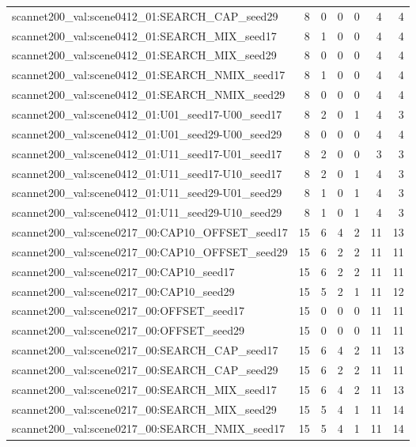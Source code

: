 \begin{table}[t]
\begin{tabular}{lrrrrrr}
scannet200\_val:scene0412\_01:SEARCH\_CAP\_seed29 & 8 & 0 & 0 & 0 & 4 & 4 \\
scannet200\_val:scene0412\_01:SEARCH\_MIX\_seed17 & 8 & 1 & 0 & 0 & 4 & 4 \\
scannet200\_val:scene0412\_01:SEARCH\_MIX\_seed29 & 8 & 0 & 0 & 0 & 4 & 4 \\
scannet200\_val:scene0412\_01:SEARCH\_NMIX\_seed17 & 8 & 1 & 0 & 0 & 4 & 4 \\
scannet200\_val:scene0412\_01:SEARCH\_NMIX\_seed29 & 8 & 0 & 0 & 0 & 4 & 4 \\
scannet200\_val:scene0412\_01:U01\_seed17-U00\_seed17 & 8 & 2 & 0 & 1 & 4 & 3 \\
scannet200\_val:scene0412\_01:U01\_seed29-U00\_seed29 & 8 & 0 & 0 & 0 & 4 & 4 \\
scannet200\_val:scene0412\_01:U11\_seed17-U01\_seed17 & 8 & 2 & 0 & 0 & 3 & 3 \\
scannet200\_val:scene0412\_01:U11\_seed17-U10\_seed17 & 8 & 2 & 0 & 1 & 4 & 3 \\
scannet200\_val:scene0412\_01:U11\_seed29-U01\_seed29 & 8 & 1 & 0 & 1 & 4 & 3 \\
scannet200\_val:scene0412\_01:U11\_seed29-U10\_seed29 & 8 & 1 & 0 & 1 & 4 & 3 \\
scannet200\_val:scene0217\_00:CAP10\_OFFSET\_seed17 & 15 & 6 & 4 & 2 & 11 & 13 \\
scannet200\_val:scene0217\_00:CAP10\_OFFSET\_seed29 & 15 & 6 & 2 & 2 & 11 & 11 \\
scannet200\_val:scene0217\_00:CAP10\_seed17 & 15 & 6 & 2 & 2 & 11 & 11 \\
scannet200\_val:scene0217\_00:CAP10\_seed29 & 15 & 5 & 2 & 1 & 11 & 12 \\
scannet200\_val:scene0217\_00:OFFSET\_seed17 & 15 & 0 & 0 & 0 & 11 & 11 \\
scannet200\_val:scene0217\_00:OFFSET\_seed29 & 15 & 0 & 0 & 0 & 11 & 11 \\
scannet200\_val:scene0217\_00:SEARCH\_CAP\_seed17 & 15 & 6 & 4 & 2 & 11 & 13 \\
scannet200\_val:scene0217\_00:SEARCH\_CAP\_seed29 & 15 & 6 & 2 & 2 & 11 & 11 \\
scannet200\_val:scene0217\_00:SEARCH\_MIX\_seed17 & 15 & 6 & 4 & 2 & 11 & 13 \\
scannet200\_val:scene0217\_00:SEARCH\_MIX\_seed29 & 15 & 5 & 4 & 1 & 11 & 14 \\
scannet200\_val:scene0217\_00:SEARCH\_NMIX\_seed17 & 15 & 5 & 4 & 1 & 11 & 14 \\

\end{tabular}
\end{table}
